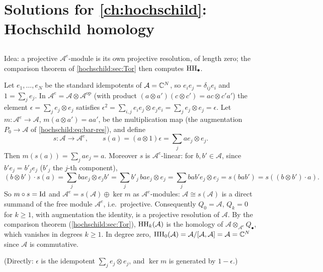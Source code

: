 \providecommand{\cA}{\mathcal{A}}
\providecommand{\cB}{\mathcal{B}}

\section{Solutions for \cref{ch:hochschild}: Hochschild homology}\label{solutions:hochschild}

\subsection*{}
Idea: a projective $\cA^e$-module is its own projective resolution, of length zero; the
comparison theorem of \cref{hochschild:sec:Tor} then computes $\operatorname{HH}_\bullet$.

Let $e_1,\dots,e_N$ be the standard idempotents of $\cA=\C^N$, so $e_ie_j=\delta_{ij}e_i$ and
$1=\sum_je_j$. In $\cA^e=\cA\otimes\cA^{\mathrm{op}}$ (with product $(a\otimes a')(c\otimes c')=ac\otimes c'a'$) the
element $\epsilon=\sum_je_j\otimes e_j$ satisfies
$\epsilon^2=\sum_{i,j}e_ie_j\otimes e_je_i=\sum_je_j\otimes e_j=\epsilon$. Let $m:\cA^e\to\cA$,
$m(a\otimes a')=aa'$, be the multiplication map (the augmentation $P_0\to\cA$ of
\eqref{hochschild:eq:bar-res}), and define
\begin{equation*}
  s:\cA\longrightarrow\cA^e,\qquad s(a)=(a\otimes1)\epsilon=\sum_jae_j\otimes e_j .
\end{equation*}
Then $m(s(a))=\sum_jae_j=a$. Moreover $s$ is $\cA^e$-linear: for $b,b'\in\cA$, since $b'e_j=b'_je_j$
($b'_j$ the $j$-th component),
\begin{equation*}
  (b\otimes b')\cdot s(a)=\sum_jbae_j\otimes e_jb'=\sum_jb'_j\,bae_j\otimes e_j=\sum_jbab'e_j\otimes e_j=s(bab')=s((b\otimes b')\cdot a).
\end{equation*}
So $m\circ s=\operatorname{Id}$ and $\cA^e=s(\cA)\oplus\ker m$ as $\cA^e$-modules: $\cA\cong s(\cA)$ is a direct summand of the
free module $\cA^e$, i.e.\ projective. Consequently $Q_0=\cA$, $Q_k=0$ for $k\ge1$, with augmentation the
identity, is a projective resolution of $\cA$. By the comparison theorem (\cref{hochschild:sec:Tor}),
$\HH_k(\cA)$ is the homology of $\cA\otimes_{\cA^e}Q_\bullet$, which vanishes in degrees $k\ge1$. In degree
zero, $\HH_0(\cA)=\cA/[\cA,\cA]=\cA=\C^N$ since $\cA$ is commutative.

(Directly: $\epsilon$ is the idempotent $\sum_je_j\otimes e_j$, and $\ker m$ is generated by $1-\epsilon$.)

